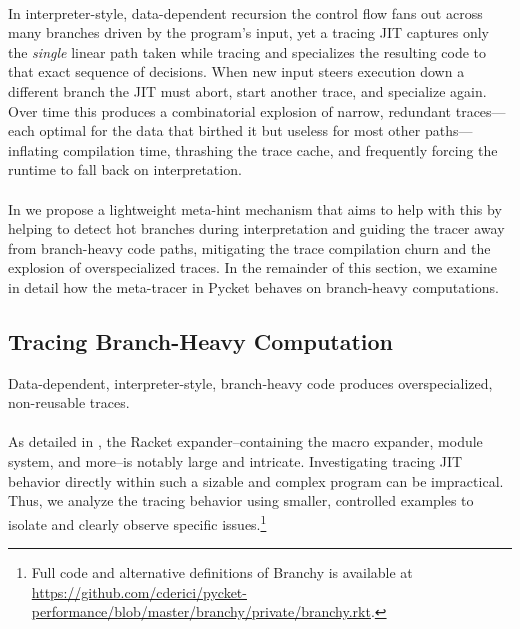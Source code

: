 		\paragraph{}%
			In interpreter-style, data-dependent recursion the control flow fans out across many branches driven by the program's input, yet a tracing JIT captures only the \emph{single} linear path taken while tracing and specializes the resulting code to that exact sequence of decisions. When new input steers execution down a different branch the JIT must abort, start another trace, and specialize again. Over time this produces a combinatorial explosion of narrow, redundant traces—each optimal for the data that birthed it but useless for most other paths—inflating compilation time, thrashing the trace cache, and frequently forcing the runtime to fall back on interpretation.

		\paragraph{}%
			In  we propose a lightweight meta-hint mechanism that aims to help with this by helping to detect hot branches during interpretation and guiding the tracer away from branch-heavy code paths, mitigating the trace compilation churn and the explosion of overspecialized traces. In the remainder of this section, we examine in detail how the meta-tracer in Pycket behaves on branch-heavy computations.

		\subsection{Tracing Branch-Heavy Computation}
			\begin{mainpoint}
				Data-dependent, interpreter-style, branch-heavy code produces overspecialized, non-reusable traces.
			\end{mainpoint}
				\label{section:branchy}

			\paragraph{}%
				As detailed in , the Racket expander--containing the macro expander, module system, and more--is notably large and intricate. Investigating tracing JIT behavior directly within such a sizable and complex program can be impractical. Thus, we analyze the tracing behavior using smaller, controlled examples to isolate and clearly observe specific issues.\footnote{Full code and alternative definitions of Branchy is available at \url{https://github.com/cderici/pycket-performance/blob/master/branchy/private/branchy.rkt}.}

